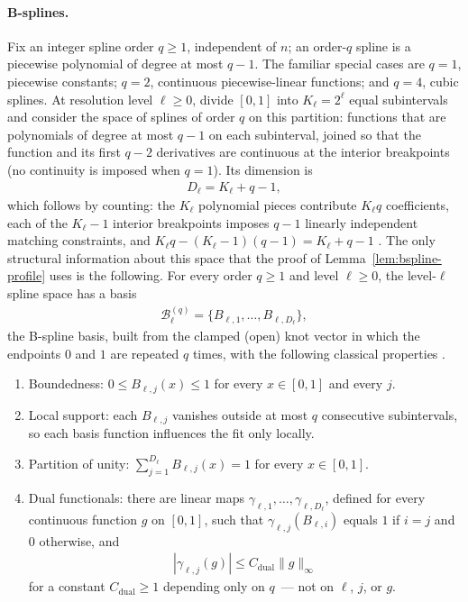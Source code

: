 \paragraph*{B-splines.}
Fix an integer spline order $q\geq1$, independent of $n$; an order-$q$ spline is a piecewise polynomial of degree at most $q-1$. The familiar special cases are $q=1$, piecewise constants; $q=2$, continuous piecewise-linear functions; and $q=4$, cubic splines. At resolution level $\ell\geq0$, divide $[0,1]$ into $K_\ell=2^\ell$ equal subintervals and consider the space of splines of order $q$ on this partition: functions that are polynomials of degree at most $q-1$ on each subinterval, joined so that the function and its first $q-2$ derivatives are continuous at the interior breakpoints (no continuity is imposed when $q=1$). Its dimension is
\begin{align*}
D_\ell=K_\ell+q-1,
\end{align*}
which follows by counting: the $K_\ell$ polynomial pieces contribute $K_\ell q$ coefficients, each of the $K_\ell-1$ interior breakpoints imposes $q-1$ linearly independent matching constraints, and $K_\ell q-(K_\ell-1)(q-1)=K_\ell+q-1$ \citep[Chapter~4]{Schumaker2007}. The only structural information about this space that the proof of Lemma~\ref{lem:bspline-profile} uses is the following. For every order $q\geq1$ and level $\ell\geq0$, the level-$\ell$ spline space has a basis
\begin{align*}
\mathcal B_\ell^{(q)}
=\{B_{\ell,1},\ldots,B_{\ell,D_\ell}\},
\end{align*}
the B-spline basis, built from the clamped (open) knot vector in which the endpoints $0$ and $1$ are repeated $q$ times, with the following classical properties \citep[Chapter~4 and Theorem~4.41]{Schumaker2007}.
\begin{enumerate}
\item Boundedness: $0\leq B_{\ell,j}(x)\leq1$ for every $x\in[0,1]$ and every $j$.
\item Local support: each $B_{\ell,j}$ vanishes outside at most $q$ consecutive subintervals, so each basis function influences the fit only locally.
\item Partition of unity: $\sum_{j=1}^{D_\ell}B_{\ell,j}(x)=1$ for every $x\in[0,1]$.
\item Dual functionals: there are linear maps $\gamma_{\ell,1},\ldots,\gamma_{\ell,D_\ell}$, defined for every continuous function $g$ on $[0,1]$, such that $\gamma_{\ell,j}(B_{\ell,i})$ equals $1$ if $i=j$ and $0$ otherwise, and
\begin{align*}
|\gamma_{\ell,j}(g)|\leq C_{\mathrm{dual}}\|g\|_\infty
\end{align*}
for a constant $C_{\mathrm{dual}}\geq1$ depending only on $q$~--- not on $\ell$, $j$, or $g$.
\end{enumerate}

